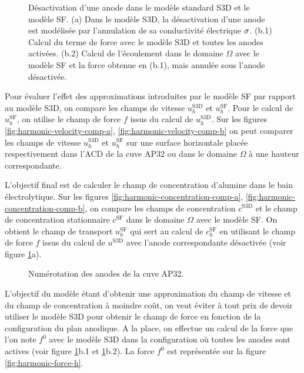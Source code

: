 \begin{figure}[h!]
  \begin{center}
    
    \caption{Désactivation d'une anode dans le modèle standard S3D et
      le modèle SF. (a) Dans le modèle S3D, la désactivation d'une
      anode est modélisée par l'annulation de sa conductivité
      électrique $\sigma$. (b.1) Calcul du terme de force avec
      le modèle S3D et toutes les anodes activées. (b.2) Calcul de
      l'écoulement dans le domaine $\Omega$ avec le modèle SF et la
      force obtenue en (b.1), mais annulée sous l'anode désactivée.}
    \label{fig:anode-deactivation}
  \end{center}
\end{figure}


Pour évaluer l'effet des approximations introduites par le modèle
SF par rapport au modèle S3D, on compare les champs de vitesse
$u_h^{\mathrm{S3D}}$ et $u_h^{\mathrm{SF}}$. Pour le calcul de
$u_h^{\mathrm{SF}}$, on utilise le champ de force $f$ issus du calcul de
$u_h^{\mathrm{S3D}}$. Sur les figures \ref{fig:harmonic-velocity-comp-a}, \ref{fig:harmonic-velocity-comp-b}
on peut comparer les champs de vitesse $u_h^{\mathrm{S3D}}$ et
$u_h^\mathrm{SF}$ sur une surface horizontale placée respectivement
dans l'ACD de la cuve AP32 ou dans le domaine $\Omega$ à une hauteur
correspondante.


L'objectif final est de calculer le champ de concentration d'alumine
dans le bain électrolytique. Sur les figures
\ref{fig:harmonic-concentration-comp-a},
\ref{fig:harmonic-concentration-comp-b}, on compare les champs de
concentration $c^\mathrm{S3D}$ et le champ de concentration
stationnaire $c^\mathrm{SF}$ dans le domaine $\Omega$ avec le modèle
SF. On obtient le champ de transport $u_h^\mathrm{SF}$ qui sert au
calcul de $c_h^\mathrm{SF}$ en utilisant le champ de force $f$ issus
du calcul de $u^\mathrm{S3D}$ avec l'anode correspondante désactivée
(voir figure \ref{fig:anode-deactivation}a).

\begin{figure}[h!]
  \begin{center}
    
    \caption{Numérotation des anodes de la cuve AP32.}
    \label{fig:anode-numerotations}
  \end{center}
\end{figure}

L'objectif du modèle étant d'obtenir une approximation du champ de
vitesse et du champ de concentration à moindre coût, on veut éviter à
tout prix de devoir utiliser le modèle S3D pour obtenir le champ de
force en fonction de la configuration du plan anodique. A la place, on
effectue un calcul de la force que l'on note $f^0$ avec le modèle S3D
dans la configuration où toutes les anodes sont actives (voir figure
\ref{fig:anode-deactivation}b.1 et
\ref{fig:anode-deactivation}b.2). La force $f^0$ est représentée sur
la figure \ref{fig:harmonic-force-h}.

